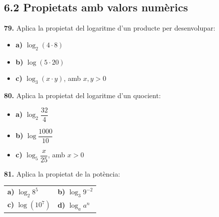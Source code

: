 \documentclass[13pt,a4paper]{extarticle}
\begin{document}
\subsection*{6.2 Propietats amb valors numèrics}

\par\noindent\begin{minipage}{\linewidth}
\textbf{79.} Aplica la propietat del logaritme d'un producte per desenvolupar:\par

\begin{itemize}[leftmargin=0pt,itemsep=3pt,topsep=3pt,parsep=0pt,label={}]
\item \textbf{a)} $\log_2\left(4\cdot 8\right)$
\item \textbf{b)} $\log\left(5\cdot 20\right)$
\item \textbf{c)} $\log_3\left(x\cdot y\right)$, amb $x,y>0$
\end{itemize}
\end{minipage}\par\vspace{1.6mm}
\par\noindent\begin{minipage}{\linewidth}
\textbf{80.} Aplica la propietat del logaritme d'un quocient:\par

\begin{itemize}[leftmargin=0pt,itemsep=3pt,topsep=3pt,parsep=0pt,label={}]
\item \textbf{a)} $\log_2 \dfrac{32}{4}$
\item \textbf{b)} $\log \dfrac{1000}{10}$
\item \textbf{c)} $\log_5 \dfrac{x}{25}$, amb $x>0$
\end{itemize}
\end{minipage}\par\vspace{1.6mm}
\par\noindent\begin{minipage}{\linewidth}
\textbf{81.} Aplica la propietat de la potència:\par

\begin{tabular}{@{}p{.46\linewidth}p{.46\linewidth}@{}}
\textbf{a)} $\log_2 8^5$ & \textbf{b)} $\log_3 9^{-2}$ \\[2pt]
\textbf{c)} $\log\left(10^7\right)$ & \textbf{d)} $\log_a a^n$ \\[2pt]
\end{tabular}\par
\end{minipage}\par\vspace{1.6mm}
\end{document}
